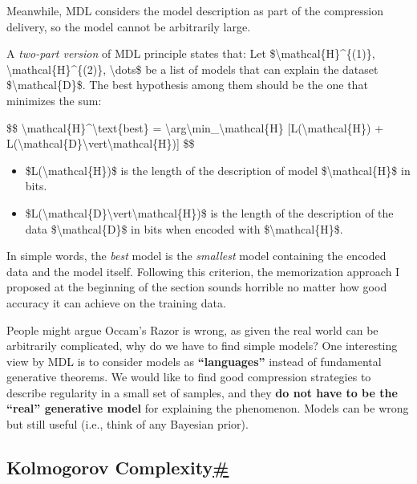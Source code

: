 Meanwhile, MDL considers the model description as part of the compression delivery, so the model cannot be arbitrarily large.

A \emph{two-part version} of MDL principle states that: Let \$\textbackslash mathcal\{H\}\^{}\{(1)\}, \textbackslash mathcal\{H\}\^{}\{(2)\}, \textbackslash dots\$ be a list of models that can explain the dataset \$\textbackslash mathcal\{D\}\$. The best hypothesis among them should be the one that minimizes the sum:

\$\$ \textbackslash mathcal\{H\}\^{}\textbackslash text\{best\} = \textbackslash arg\textbackslash min\_\textbackslash mathcal\{H\} {[}L(\textbackslash mathcal\{H\}) + L(\textbackslash mathcal\{D\}\textbackslash vert\textbackslash mathcal\{H\}){]} \$\$

\begin{itemize}
\tightlist
\item
  \$L(\textbackslash mathcal\{H\})\$ is the length of the description of model \$\textbackslash mathcal\{H\}\$ in bits.
\item
  \$L(\textbackslash mathcal\{D\}\textbackslash vert\textbackslash mathcal\{H\})\$ is the length of the description of the data \$\textbackslash mathcal\{D\}\$ in bits when encoded with \$\textbackslash mathcal\{H\}\$.
\end{itemize}

In simple words, the \emph{best} model is the \emph{smallest} model containing the encoded data and the model itself. Following this criterion, the memorization approach I proposed at the beginning of the section sounds horrible no matter how good accuracy it can achieve on the training data.

People might argue Occam's Razor is wrong, as given the real world can be arbitrarily complicated, why do we have to find simple models? One interesting view by MDL is to consider models as \textbf{``languages''} instead of fundamental generative theorems. We would like to find good compression strategies to describe regularity in a small set of samples, and they \textbf{do not have to be the ``real'' generative model} for explaining the phenomenon. Models can be wrong but still useful (i.e., think of any Bayesian prior).

\subsection{\texorpdfstring{Kolmogorov Complexity\hyperref[kolmogorov-complexity]{\#}}{Kolmogorov Complexity\#}}\label{kolmogorov-complexity}

